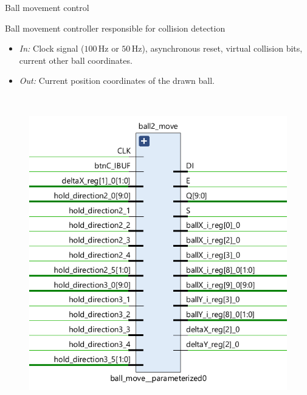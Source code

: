 \documentclass[aspectratio=169, 11pt, hyperref={unicode}]{beamer}
\def\Hz{\,\mathrm{Hz}}
\begin{document}
\begin{frame}{Ball movement control}
    \begin{minipage}{.45\textwidth}
        Ball movement controller responsible for collision detection
        \begin{itemize}
            \item \emph{In:} Clock signal ($100\Hz$ or $50\Hz$), asynchronous reset, virtual collision bits, current other ball coordinates.
            \item \emph{Out:} Current position coordinates of the drawn ball.
        \end{itemize}
    \end{minipage}
    ~
    \begin{minipage}{.45\textwidth}
        \begin{figure}[!ht]
            \centering
            \includegraphics[width=\textwidth]{src/ball-move.png}
        \end{figure}
    \end{minipage}
\end{frame}
\end{document}
